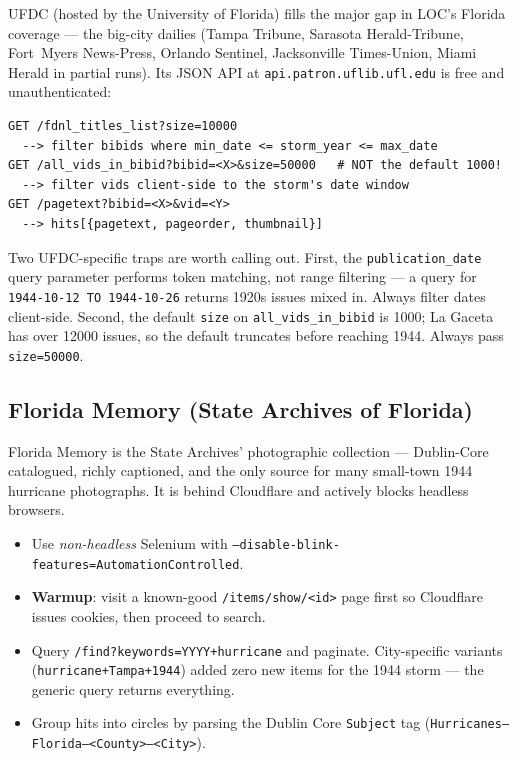\documentclass[11pt,letterpaper]{article}
\begin{document}
UFDC (hosted by the University of Florida) fills the major gap in LOC's Florida coverage --- the big-city dailies (Tampa Tribune, Sarasota Herald-Tribune, Fort~Myers News-Press, Orlando Sentinel, Jacksonville Times-Union, Miami Herald in partial runs). Its JSON API at \texttt{api.patron.uflib.ufl.edu} is free and unauthenticated:

\begin{lstlisting}[caption={UFDC two-step query}]
GET /fdnl_titles_list?size=10000
  --> filter bibids where min_date <= storm_year <= max_date
GET /all_vids_in_bibid?bibid=<X>&size=50000   # NOT the default 1000!
  --> filter vids client-side to the storm's date window
GET /pagetext?bibid=<X>&vid=<Y>
  --> hits[{pagetext, pageorder, thumbnail}]
\end{lstlisting}

Two UFDC-specific traps are worth calling out. First, the \texttt{publication\_date} query parameter performs token matching, not range filtering --- a query for \texttt{1944-10-12 TO 1944-10-26} returns 1920s issues mixed in. Always filter dates client-side. Second, the default \texttt{size} on \texttt{all\_vids\_in\_bibid} is 1000; La Gaceta has over 12000 issues, so the default truncates before reaching 1944. Always pass \texttt{size=50000}.

\subsection{Florida Memory (State Archives of Florida)}

Florida Memory is the State Archives' photographic collection --- Dublin-Core catalogued, richly captioned, and the only source for many small-town 1944 hurricane photographs. It is behind Cloudflare and actively blocks headless browsers.

\begin{itemize}
  \item Use \emph{non-headless} Selenium with \texttt{--disable-blink-features=AutomationControlled}.
  \item \textbf{Warmup}: visit a known-good \texttt{/items/show/<id>} page first so Cloudflare issues cookies, then proceed to search.
  \item Query \texttt{/find?keywords=YYYY+hurricane} and paginate. City-specific variants (\texttt{hurricane+Tampa+1944}) added zero new items for the 1944 storm --- the generic query returns everything.
  \item Group hits into circles by parsing the Dublin Core \texttt{Subject} tag (\texttt{Hurricanes--Florida--<County>--<City>}).
\end{itemize}
\end{document}
